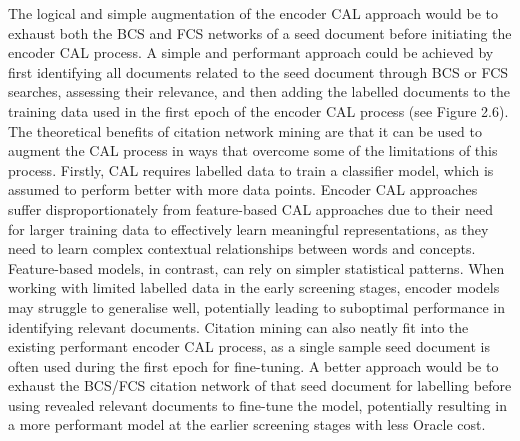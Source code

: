 \documentclass[10pt,oneside]{book}
\begin{document}
The logical and simple augmentation of the encoder CAL approach would be to exhaust both the BCS and FCS networks of a seed document before initiating the encoder CAL process. A simple and performant approach could be achieved by first identifying all documents related to the seed document through BCS or FCS searches, assessing their relevance, and then adding the labelled documents to the training data used in the first epoch of the encoder CAL process (see Figure 2.6). The theoretical benefits of citation network mining are that it can be used to augment the CAL process in ways that overcome some of the limitations of this process. Firstly, CAL requires labelled data to train a classifier model, which is assumed to perform better with more data points. Encoder CAL approaches suffer disproportionately from feature-based CAL approaches due to their need for larger training data to effectively learn meaningful representations, as they need to learn complex contextual relationships between words and concepts. Feature-based models, in contrast, can rely on simpler statistical patterns. When working with limited labelled data in the early screening stages, encoder models may struggle to generalise well, potentially leading to suboptimal performance in identifying relevant documents. Citation mining can also neatly fit into the existing performant encoder CAL process, as a single sample seed document is often used during the first epoch for fine-tuning. A better approach would be to exhaust the BCS/FCS citation network of that seed document for labelling before using revealed relevant documents to fine-tune the model, potentially resulting in a more performant model at the earlier screening stages with less Oracle cost.
\end{document}
